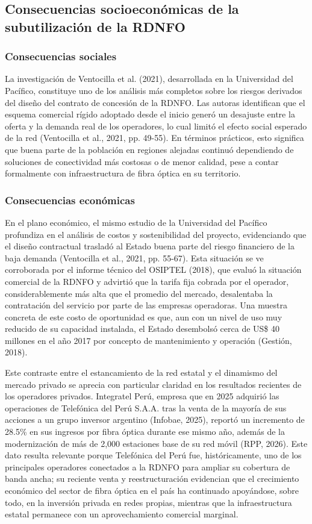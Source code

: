 \subsection{Consecuencias socioeconómicas de la subutilización de la RDNFO}
\subsubsection{Consecuencias sociales}
La investigación de Ventocilla et al. (2021), desarrollada en la Universidad del Pacífico, constituye uno de los análisis más completos sobre los riesgos derivados del diseño del contrato de concesión de la RDNFO. Las autoras identifican que el esquema comercial rígido adoptado desde el inicio generó un desajuste entre la oferta y la demanda real de los operadores, lo cual limitó el efecto social esperado de la red (Ventocilla et al., 2021, pp. 49-55). En términos prácticos, esto significa que buena parte de la población en regiones alejadas continuó dependiendo de soluciones de conectividad más costosas o de menor calidad, pese a contar formalmente con infraestructura de fibra óptica en su territorio.

\subsubsection{Consecuencias económicas}
En el plano económico, el mismo estudio de la Universidad del Pacífico profundiza en el análisis de costos y sostenibilidad del proyecto, evidenciando que el diseño contractual trasladó al Estado buena parte del riesgo financiero de la baja demanda (Ventocilla et al., 2021, pp. 55-67). Esta situación se ve corroborada por el informe técnico del OSIPTEL (2018), que evaluó la situación comercial de la RDNFO y advirtió que la tarifa fija cobrada por el operador, considerablemente más alta que el promedio del mercado, desalentaba la contratación del servicio por parte de las empresas operadoras. Una muestra concreta de este costo de oportunidad es que, aun con un nivel de uso muy reducido de su capacidad instalada, el Estado desembolsó cerca de US\$ 40 millones en el año 2017 por concepto de mantenimiento y operación (Gestión, 2018).

Este contraste entre el estancamiento de la red estatal y el dinamismo del mercado privado se aprecia con particular claridad en los resultados recientes de los operadores privados. Integratel Perú, empresa que en 2025 adquirió las operaciones de Telefónica del Perú S.A.A. tras la venta de la mayoría de sus acciones a un grupo inversor argentino (Infobae, 2025), reportó un incremento de 28.5\% en sus ingresos por fibra óptica durante ese mismo año, además de la modernización de más de 2,000 estaciones base de su red móvil (RPP, 2026). Este dato resulta relevante porque Telefónica del Perú fue, históricamente, uno de los principales operadores conectados a la RDNFO para ampliar su cobertura de banda ancha; su reciente venta y reestructuración evidencian que el crecimiento económico del sector de fibra óptica en el país ha continuado apoyándose, sobre todo, en la inversión privada en redes propias, mientras que la infraestructura estatal permanece con un aprovechamiento comercial marginal.


